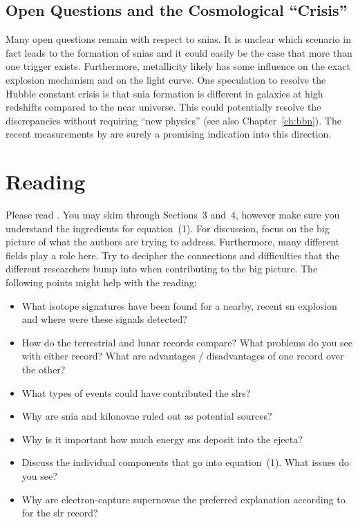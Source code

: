 \subsection{Open Questions and the Cosmological ``Crisis''}

Many open questions remain with respect to \acp{snia}. It is unclear which scenario in fact leads to the formation of \acp{snia} and it could easily be the case that more than one trigger exists. Furthermore, metallicity likely has some influence on the exact explosion mechanism and on the light curve. One speculation to resolve the Hubble constant crisis is that \ac{snia} formation is different in galaxies at high redshifts compared to the near universe. This could potentially resolve the discrepancies without requiring ``new physics'' (see also Chapter~\ref{ch:bbn}). The recent measurements by \citet{freedman19} are surely a promising indication into this direction.






\section{Reading}

Please read \citet{fry15}. You may skim through Sections~3 and~4, however make sure you understand the ingredients for equation~(1). For discussion, focus on the big picture of what the authors are trying to address. Furthermore, many different fields play a role here. Try to decipher the connections and difficulties that the different researchers bump into when contributing to the big picture. The following points might help with the reading:

\begin{itemize}
    \item What isotope signatures have been found for a nearby, recent \ac{sn} explosion and where were these signals detected?
    \item How do the terrestrial and lunar records compare? What problems do you see with either record? What are advantages / disadvantages of one record over the other?
    \item What types of events could have contributed the \acp{slr}?
    \item Why are \ac{snia} and kilonovae ruled out as potential sources?
    \item Why is it important how much energy \acp{sn} deposit into the ejecta?
    \item Discuss the individual components that go into equation~(1). What issues do you see?
    \item Why are electron-capture supernovae the preferred explanation according to \citet{fry15} for the \ac{slr} record?
\end{itemize}
